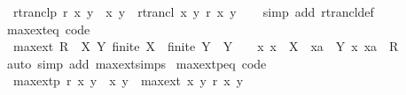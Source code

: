 \begin{isabellebody}
\ \ {\isachardoublequoteopen}rtranclp\ r\ x\ y\ {\isasymlongleftrightarrow}\ {\isacharparenleft}{\kern0pt}x{\isacharcomma}{\kern0pt}\ y{\isacharparenright}{\kern0pt}\ {\isasymin}\ rtrancl\ {\isacharbraceleft}{\kern0pt}{\isacharparenleft}{\kern0pt}x{\isacharcomma}{\kern0pt}\ y{\isacharparenright}{\kern0pt}{\isachardot}{\kern0pt}\ r\ x\ y{\isacharbraceright}{\kern0pt}{\isachardoublequoteclose}\isanewline
%
\isadelimproof
\ \ %
\endisadelimproof
%
\isatagproof
{}\isamarkupfalse%
\ {\isacharparenleft}{\kern0pt}simp\ add{\isacharcolon}{\kern0pt}\ rtrancl{\isacharunderscore}{\kern0pt}def{\isacharparenright}{\kern0pt}%
\endisatagproof
{\isafoldproof}%
%
\isadelimproof
\isanewline
%
\endisadelimproof
\isanewline
{}\isamarkupfalse%
\ max{\isacharunderscore}{\kern0pt}ext{\isacharunderscore}{\kern0pt}eq\ {\isacharbrackleft}{\kern0pt}code{\isacharbrackright}{\kern0pt}{\isacharcolon}{\kern0pt}\isanewline
\ \ {\isachardoublequoteopen}max{\isacharunderscore}{\kern0pt}ext\ R\ {\isacharequal}{\kern0pt}\ {\isacharbraceleft}{\kern0pt}{\isacharparenleft}{\kern0pt}X{\isacharcomma}{\kern0pt}\ Y{\isacharparenright}{\kern0pt}{\isachardot}{\kern0pt}\ finite\ X\ {\isasymand}\ finite\ Y\ {\isasymand}\ Y\ {\isasymnoteq}\ {\isacharbraceleft}{\kern0pt}{\isacharbraceright}{\kern0pt}\ {\isasymand}\ {\isacharparenleft}{\kern0pt}{\isasymforall}x{\isachardot}{\kern0pt}\ x\ {\isasymin}\ X\ {\isasymlongrightarrow}\ {\isacharparenleft}{\kern0pt}{\isasymexists}xa\ {\isasymin}\ Y{\isachardot}{\kern0pt}\ {\isacharparenleft}{\kern0pt}x{\isacharcomma}{\kern0pt}\ xa{\isacharparenright}{\kern0pt}\ {\isasymin}\ R{\isacharparenright}{\kern0pt}{\isacharparenright}{\kern0pt}{\isacharbraceright}{\kern0pt}{\isachardoublequoteclose}\isanewline
%
\isadelimproof
\ \ %
\endisadelimproof
%
\isatagproof
{}\isamarkupfalse%
\ {\isacharparenleft}{\kern0pt}auto\ simp\ add{\isacharcolon}{\kern0pt}\ max{\isacharunderscore}{\kern0pt}ext{\isachardot}{\kern0pt}simps{\isacharparenright}{\kern0pt}%
\endisatagproof
{\isafoldproof}%
%
\isadelimproof
\isanewline
%
\endisadelimproof
\isanewline
{}\isamarkupfalse%
\ max{\isacharunderscore}{\kern0pt}extp{\isacharunderscore}{\kern0pt}eq\ {\isacharbrackleft}{\kern0pt}code{\isacharbrackright}{\kern0pt}{\isacharcolon}{\kern0pt}\isanewline
\ \ {\isachardoublequoteopen}max{\isacharunderscore}{\kern0pt}extp\ r\ x\ y\ {\isasymlongleftrightarrow}\ {\isacharparenleft}{\kern0pt}x{\isacharcomma}{\kern0pt}\ y{\isacharparenright}{\kern0pt}\ {\isasymin}\ max{\isacharunderscore}{\kern0pt}ext\ {\isacharbraceleft}{\kern0pt}{\isacharparenleft}{\kern0pt}x{\isacharcomma}{\kern0pt}\ y{\isacharparenright}{\kern0pt}{\isachardot}{\kern0pt}\ r\ x\ y{\isacharbraceright}{\kern0pt}{\isachardoublequoteclose}\isanewline

\end{isabellebody}
